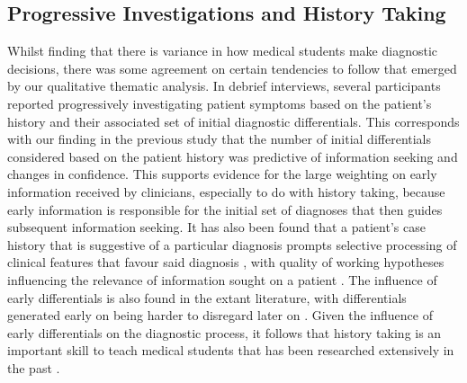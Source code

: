 \documentclass[a4paper, nobind]{templates/ociamthesis}
\begin{document}
\subsection{Progressive Investigations and History Taking}\label{progressive-investigations-and-history-taking}

Whilst finding that there is variance in how medical students make diagnostic decisions, there was some agreement on certain tendencies to follow that emerged by our qualitative thematic analysis. In debrief interviews, several participants reported progressively investigating patient symptoms based on the patient's history and their associated set of initial diagnostic differentials. This corresponds with our finding in the previous study that the number of initial differentials considered based on the patient history was predictive of information seeking and changes in confidence. This supports evidence for the large weighting on early information received by clinicians, especially to do with history taking, because early information is responsible for the initial set of diagnoses that then guides subsequent information seeking. It has also been found that a patient's case history that is suggestive of a particular diagnosis prompts selective processing of clinical features that favour said diagnosis \autocite{leblanc_believing_2002}, with quality of working hypotheses influencing the relevance of information sought on a patient \autocite{brooks_difficulty_2000}. The influence of early differentials is also found in the extant literature, with differentials generated early on being harder to disregard later on \autocite{kourtidis_influences_2022,redelmeier_fallacy_2023}. Given the influence of early differentials on the diagnostic process, it follows that history taking is an important skill to teach medical students that has been researched extensively in the past \autocite{keifenheim_teaching_2015}.
\end{document}
